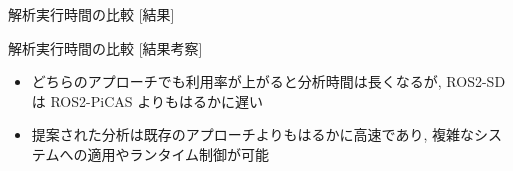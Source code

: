 \begin{frame}{解析実行時間の比較 [結果]}
\end{frame}

\begin{frame}{解析実行時間の比較 [結果考察]}
    \begin{itemize}
        \item どちらのアプローチでも利用率が上がると分析時間は長くなるが, ROS2-SD は ROS2-PiCAS よりもはるかに遅い
        \item 提案された分析は既存のアプローチよりもはるかに高速であり, 複雑なシステムへの適用やランタイム制御が可能
    \end{itemize}
\end{frame}
